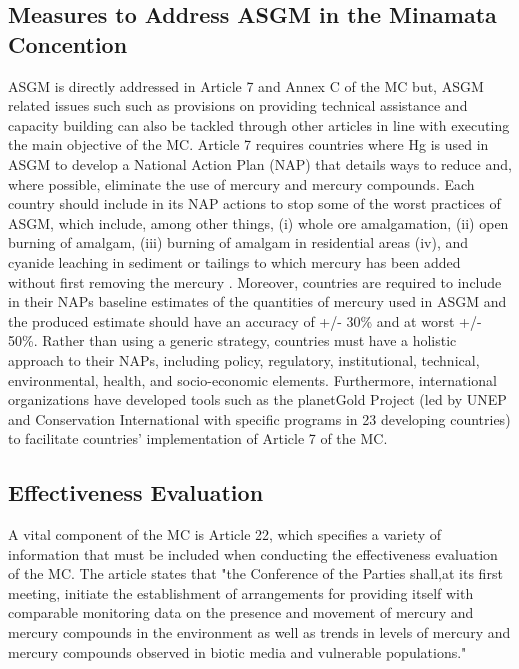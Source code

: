 \subsection{Measures to Address ASGM in the Minamata Concention}
ASGM is directly addressed in Article 7 and Annex C of the MC but, ASGM related issues such such as provisions on providing technical assistance and capacity building can also be tackled through other articles in line with executing the main objective of the MC. Article 7 requires countries where Hg is used in ASGM to develop a National Action Plan (NAP) that details ways to reduce and, where possible, eliminate the use of mercury and mercury compounds. Each country should include in its NAP actions to stop some of the worst practices of ASGM, which include, among other things, (i) whole ore amalgamation, (ii) open burning of amalgam, (iii) burning of amalgam in residential areas (iv), and cyanide leaching in sediment or tailings to which mercury has been added without first removing the mercury \cite{unep_minamata_2019}. Moreover, countries are required to include in their NAPs baseline estimates of the quantities of mercury used in ASGM and the produced estimate should have an accuracy of +/- 30\% and at worst +/- 50\%\cite{programme_estimating_2017}. Rather than using a generic strategy, countries must have a holistic approach to their NAPs, including policy, regulatory, institutional, technical, environmental, health, and socio-economic elements. Furthermore, international organizations have developed tools such as the planetGold Project (led by UNEP and Conservation International with specific programs in 23 developing countries) to facilitate countries' implementation of Article 7 of the MC. 

\subsection{Effectiveness Evaluation}
 A vital component of the MC is Article 22, which specifies a variety of information that must be included when conducting the effectiveness evaluation of the MC. The article states that "the Conference of the Parties shall,at its first meeting, initiate the establishment of arrangements for providing itself with comparable monitoring data on the presence and movement of mercury and mercury compounds in the environment as well as trends in levels of mercury and mercury compounds observed in biotic media and vulnerable populations."
 
